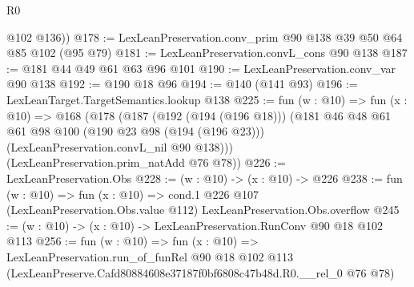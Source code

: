 \begin{lexlean}{R0}
\begin{coremodule}
        @102
        @136))
@178 := LexLeanPreservation.conv_prim @90 @138 @39 @50 @64 @85 @102 (@95 @79)
@181 := LexLeanPreservation.convL_cons @90 @138
@187 := @181 @44 @49 @61 @63 @96 @101
@190 := LexLeanPreservation.conv_var @90 @138
@192 := @190 @18 @96
@194 := @140 (@141 @93)
@196 := LexLeanTarget.TargetSemantics.lookup @138
@225 := fun (w : @10) =>
  fun (x : @10) =>
  @168
    (@178
      (@187
        (@192 (@194 (@196 @18)))
        (@181
          @46
          @48
          @61
          @61
          @98
          @100
          (@190 @23 @98 (@194 (@196 @23)))
          (LexLeanPreservation.convL_nil @90 @138)))
      (LexLeanPreservation.prim_natAdd @76 @78))
@226 := LexLeanPreservation.Obs
@228 := (w : @10) -> (x : @10) -> @226
@238 := fun (w : @10) =>
  fun (x : @10) =>
  cond.{1} @226 @107 (LexLeanPreservation.Obs.value @112) LexLeanPreservation.Obs.overflow
@245 := (w : @10) -> (x : @10) -> LexLeanPreservation.RunConv @90 @18 @102 @113
@256 := fun (w : @10) =>
  fun (x : @10) =>
  LexLeanPreservation.run_of_funRel
    @90
    @18
    @102
    @113
    (LexLeanPreserve.Cafd80884608e37187f0bf6808c47b48d.R0.__rel_0 @76 @78)
\end{coremodule}
\end{lexlean}
